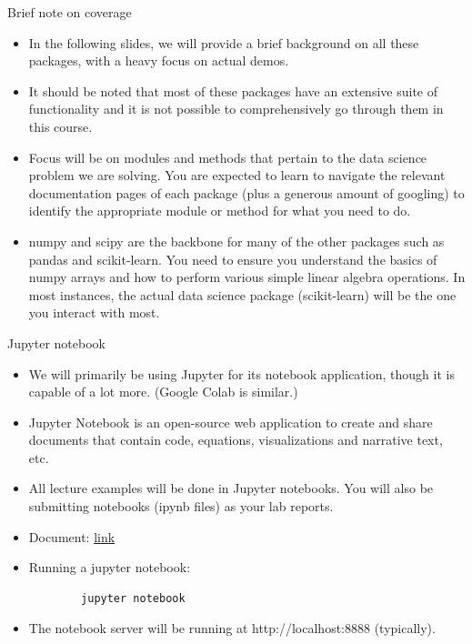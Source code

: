 \documentclass[aspectratio=169]{beamer}
\begin{document}
    \begin{frame}{Brief note on coverage}
        \begin{itemize}
            \item In the following slides, we will provide a brief background on all these packages, with a heavy focus on actual demos.
            \item It should be noted that most of these packages have an extensive suite of functionality and it is not possible to comprehensively go through them in this course.
            \item Focus will be on modules and methods that pertain to the data science problem we are solving. You are expected to learn to navigate the relevant documentation pages of each package (plus a generous amount of googling) to identify the appropriate module or method for what you need to do.
            \item numpy and scipy are the backbone for many of the other packages such as pandas and scikit-learn. You need to ensure you understand the basics of numpy arrays and how to perform various simple linear algebra operations. In most instances, the actual data science package (scikit-learn) will be the one you interact with most.
        \end{itemize}
    \end{frame}


    \begin{frame}[fragile]{Jupyter notebook}
        \begin{itemize}
            \item We will primarily be using Jupyter for its notebook application, though it is capable of a lot more. (Google Colab is similar.)
            \item Jupyter Notebook is an open-source web application to create and share documents that contain code, equations, visualizations and narrative text, etc.
            \item All lecture examples will be done in Jupyter notebooks. You will also be submitting notebooks (ipynb files) as your lab reports.
            \item Document: \href{http://jupyter-notebook.readthedocs.io/en/stable/}{link}
            \item Running a jupyter notebook:
            \begin{verbatim}
        jupyter notebook
            \end{verbatim}
            \item The notebook server will be running at http://localhost:8888 (typically).
        \end{itemize}
    \end{frame}
\end{document}
